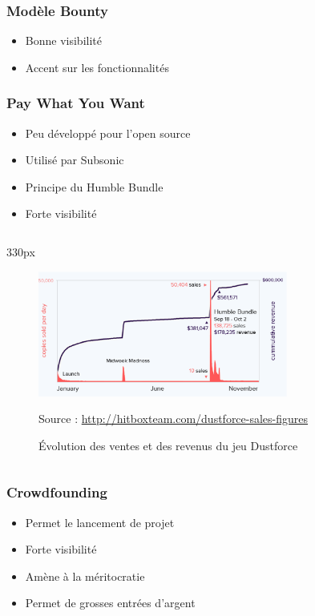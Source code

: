 \begin{frame}
\frametitle{Modèle Bounty}

\begin{itemize}
    \itemsep1.5em
    \item Bonne visibilité
    \item Accent sur les fonctionnalités
\end{itemize}
\end{frame}


\begin{frame}
\frametitle{Pay What You Want}

\begin{itemize}
    \itemsep1.5em
    \item Peu développé pour l'open source
    \item Utilisé par Subsonic
    \item Principe du Humble Bundle
    \item Forte visibilité
\end{itemize}
\end{frame}


\begin{frame}
\begin{center}
\begin{columns}
\begin{column}{330px}
{
    \begin{figure}[h!]
        \centering
        \includegraphics[width=310px]
            {images/section1/courbe-ventes-dustforce.eps}
        \caption{Évolution des ventes et des revenus du jeu Dustforce}
        \scriptsize{Source :
            \url{http://hitboxteam.com/dustforce-sales-figures}}
    \end{figure}
}
\end{column}
\end{columns}
\end{center}
\end{frame}


\begin{frame}   %
\frametitle{Crowdfounding}

\begin{itemize}
    \itemsep1.5em
    \item Permet le lancement de projet
    \item Forte visibilité
    \item Amène à la méritocratie
    \item Permet de grosses entrées d'argent
\end{itemize}
\end{frame}


